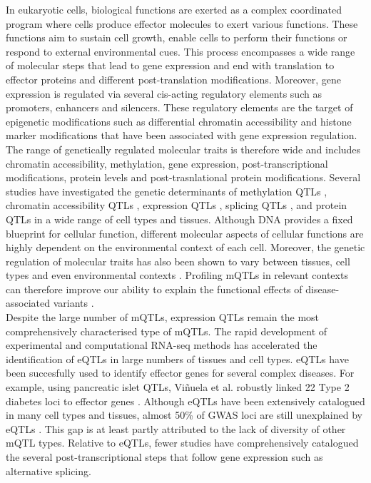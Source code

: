 In eukaryotic cells, biological functions are exerted as a complex coordinated program where cells produce effector molecules to exert various functions. These functions aim to sustain cell growth, enable cells to perform their functions or respond to external environmental cues. This process encompasses a wide range of molecular steps that lead to gene expression and end with translation to effector proteins and different post-translation modifications. Moreover, gene expression is regulated via several cis-acting regulatory elements such as promoters, enhancers and silencers. These regulatory elements are the target of epigenetic modifications such as differential chromatin accessibility and histone marker modifications that have been associated with gene expression regulation. The range of genetically regulated molecular traits is therefore wide and includes chromatin accessibility, methylation, gene expression, post-transcriptional modifications, protein levels and post-trasnlational protein modifications. Several studies have investigated the genetic determinants of methylation QTLs \cite{Oliva2023-nt,Hannon2016-mt,Morrow2018-fv,Taylor2019-tm,Huan2019-ke,Andrews2017-os}, chromatin accessibility QTLs \cite{Alasoo2018-pv,Currin2021-kp}, expression QTLs \cite{The_GTEx_Consortium2020-gg,Vosa2021-pb,Kerimov2021-gh}, splicing QTLs \cite{The_GTEx_Consortium2020-gg,Qi2022-iz}, and protein QTLs \cite{Yao2018-oy,Sun2018-uy} in a wide range of cell types and tissues. Although DNA provides a fixed blueprint for cellular function, different molecular aspects of cellular functions are highly dependent on the environmental context of each cell. Moreover, the genetic regulation of molecular traits has also been shown to vary between tissues, cell types and even environmental contexts \cite{Zhernakova2017-uo,Mu2021-ar}. Profiling mQTLs in relevant contexts can therefore improve our ability to explain the functional effects of disease-associated variants \cite{Ongen2017-cd}.\\

Despite the large number of mQTLs, expression QTLs remain the most comprehensively characterised type of mQTLs. The rapid development of experimental and computational RNA-seq methods has accelerated the identification of eQTLs in large numbers of tissues and cell types. eQTLs have been succesfully used to identify effector genes for several complex diseases. For example, using pancreatic islet QTLs, Viñuela et al. robustly linked 22 Type 2 diabetes loci to effector genes \cite{Vinuela2020-ce}. Although eQTLs have been extensively catalogued in many cell types and tissues, almost 50\% of GWAS loci are still unexplained by eQTLs \cite{Mountjoy2021-fc}. This gap is at least partly attributed to the lack of diversity of other mQTL types. Relative to eQTLs, fewer studies have comprehensively catalogued the several post-transcriptional steps that follow gene expression such as alternative splicing.\\

